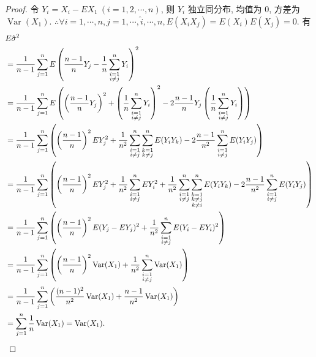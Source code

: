\documentclass[color=black,device=normal,lang=cn]{elegantnote}
\numberwithin{equation}{section}
\theoremstyle{plain}
\numberwithin{exercise}{exsection}
\begin{document}
\begin{proof}
    令 $Y_i=X_i-EX_1\ (i=1,2,\cdots,n)$, 则 $Y_i$ 独立同分布, 均值为 $0$, 方差为 $\operatorname{Var}(X_1)$. $\therefore\forall i=1,\cdots,n,j=1,\cdots,\hat{i},\cdots,n,E(X_iX_j)=E(X_i)E(X_j)=0$. 有
    \begin{align*}
        & E\hat{\sigma}^2 \\
        & =\dfrac{1}{n-1}\sum\limits_{j=1}^nE\left(\dfrac{n-1}{n}Y_j-\dfrac{1}{n}\sum\limits_{\substack{i=1\\i\neq j}}^nY_i\right)^2 \\
        & =\dfrac{1}{n-1}\sum\limits_{j=1}^nE\left(\left(\dfrac{n-1}{n}Y_j\right)^2+\left(\dfrac{1}{n}\sum\limits_{\substack{i=1\\i\neq j}}^nY_i\right)^2-2\dfrac{n-1}{n}Y_j\left(\dfrac{1}{n}\sum\limits_{\substack{i=1\\i\neq j}}^nY_i\right)\right) \\
        & =\dfrac{1}{n-1}\sum\limits_{j=1}^n\left(\left(\dfrac{n-1}{n}\right)^2EY_j^2+\dfrac{1}{n^2}\sum\limits_{\substack{i=1\\i\neq j}}^n\sum\limits_{\substack{k=1\\k\neq j}}^nE(Y_iY_k)-2\dfrac{n-1}{n^2}\sum\limits_{\substack{i=1\\i\neq j}}^nE(Y_iY_j)\right) \\
        & =\dfrac{1}{n-1}\sum\limits_{j=1}^n\left(\left(\dfrac{n-1}{n}\right)^2EY_j^2+\dfrac{1}{n^2}\sum\limits_{\substack{i=1\\i\neq j}}^nEY_i^2+\dfrac{1}{n^2}\sum\limits_{\substack{i=1\\i\neq j}}^n\sum\limits_{\substack{k=1\\k\neq j\\k\neq i}}^nE(Y_iY_k)-2\dfrac{n-1}{n^2}\sum\limits_{\substack{i=1\\i\neq j}}^nE(Y_iY_j)\right) \\
        & =\dfrac{1}{n-1}\sum\limits_{j=1}^n\left(\left(\dfrac{n-1}{n}\right)^2E(Y_j-EY_j)^2+\dfrac{1}{n^2}\sum\limits_{\substack{i=1\\i\neq j}}^nE(Y_i-EY_i)^2\right) \\
        & =\dfrac{1}{n-1}\sum\limits_{j=1}^n\left(\left(\dfrac{n-1}{n}\right)^2\operatorname{Var}(X_1)+\dfrac{1}{n^2}\sum\limits_{\substack{i=1\\i\neq j}}^n\operatorname{Var}(X_1)\right) \\
        & =\dfrac{1}{n-1}\sum\limits_{j=1}^n\left(\dfrac{(n-1)^2}{n^2}\operatorname{Var}(X_1)+\dfrac{n-1}{n^2}\operatorname{Var}(X_1)\right) \\
        & =\sum\limits_{j=1}^n\dfrac{1}{n}\operatorname{Var}(X_1)=\operatorname{Var}(X_1).\qedhere
    \end{align*}
\end{proof}
\end{document}
